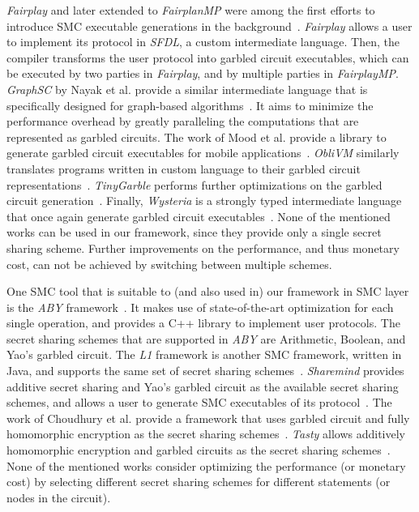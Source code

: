 \documentclass{llncs}
\begin{document}
\emph{Fairplay} and later extended to \emph{FairplanMP} were among the first efforts to introduce SMC executable generations in the background~\cite{cite:malkhi2004fairplay, cite:ben2008fairplaymp}. \emph{Fairplay} allows a user to implement its protocol in \emph{SFDL}, a custom intermediate language. Then, the compiler transforms the user protocol into garbled circuit executables, which can be executed by two parties in \emph{Fairplay}, and by multiple parties in \emph{FairplayMP}. \emph{GraphSC} by Nayak et al. provide a similar intermediate language that is specifically designed for graph-based algorithms~\cite{cite:nayak2015graphsc}. It aims to minimize the performance overhead by greatly paralleling the computations that are represented as garbled circuits. The work of Mood et al. provide a library to generate garbled circuit executables for mobile applications~\cite{cite:mood2012memory}. \emph{ObliVM} similarly translates programs written in custom language to their garbled circuit representations~\cite{cite:wang2015oblivm}. \emph{TinyGarble} performs further optimizations on the garbled circuit generation~\cite{cite:songhori2015tinygarble}. Finally, \emph{Wysteria} is a strongly typed intermediate language that once again generate garbled circuit executables~\cite{cite:rastogi2014wysteria}. None of the mentioned works can be used in our framework, since they provide only a single secret sharing scheme. Further improvements on the performance, and thus monetary cost, can not be achieved by switching between multiple schemes. 

One SMC tool that is suitable to (and also used in) our framework in SMC layer is the \emph{ABY} framework~\cite{cite:demmler2015aby}. It makes use of state-of-the-art optimization for each single operation, and provides a C++ library to implement user protocols. The secret sharing schemes that are supported in \emph{ABY} are Arithmetic, Boolean, and Yao's garbled circuit. The \emph{L1} framework is another SMC framework, written in Java, and supports the same set of secret sharing schemes~\cite{cite:schropfer2011l1}. \emph{Sharemind} provides additive secret sharing and Yao's garbled circuit as the available secret sharing schemes, and allows a user to generate SMC executables of its protocol~\cite{cite:bogdanov2008sharemind}. The work of Choudhury et al. provide a framework that uses garbled circuit and fully homomorphic encryption as the secret sharing schemes~\cite{cite:choudhury2013between}. \emph{Tasty} allows additively homomorphic encryption and garbled circuits as the secret sharing schemes~\cite{cite:henecka2010tasty}. None of the mentioned works consider optimizing the performance (or monetary cost) by selecting different secret sharing schemes for different statements (or nodes in the circuit). 
\end{document}
